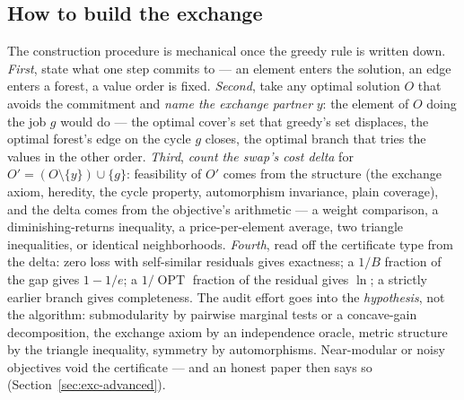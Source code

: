 \subsection{How to build the exchange}
\label{sec:exc-build}

The construction procedure is mechanical once the greedy rule is written down.
\emph{First}, state what one step commits to --- an element enters the solution, an
edge enters a forest, a value order is fixed. \emph{Second}, take any optimal solution
$O$ that avoids the commitment and \emph{name the exchange partner} $y$: the element
of $O$ doing the job $g$ would do --- the optimal cover's set that greedy's set
displaces, the optimal forest's edge on the cycle $g$ closes, the optimal branch that
tries the values in the other order. \emph{Third}, \emph{count the swap's cost delta}
for $O' = (O\setminus\{y\})\cup\{g\}$: feasibility of $O'$ comes from the structure
(the exchange axiom, heredity, the cycle property, automorphism invariance, plain
coverage), and the delta comes from the objective's arithmetic --- a weight
comparison, a diminishing-returns inequality, a price-per-element average, two
triangle inequalities, or identical neighborhoods. \emph{Fourth}, read off the
certificate type from the delta: zero loss with self-similar residuals gives
exactness; a $1/B$ fraction of the gap gives $1-1/e$; a $1/\operatorname{OPT}$
fraction of the residual gives $\ln$; a strictly earlier branch gives completeness.
The audit effort goes into the \emph{hypothesis}, not the algorithm: submodularity by
pairwise marginal tests or a concave-gain decomposition, the exchange axiom by an
independence oracle, metric structure by the triangle inequality, symmetry by
automorphisms. Near-modular or noisy objectives void the certificate --- and an
honest paper then says so (Section~\ref{sec:exc-advanced}).

